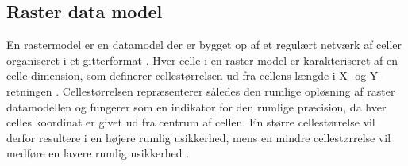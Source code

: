 \subsection{Raster data model} \label{Afsnit: Raster data model}
En rastermodel er en datamodel der er bygget op af et regulært netværk af celler organiseret i et gitterformat \citep{bolstad_gis_2022, esri_raster}. Hver celle i en raster model er karakteriseret af en celle dimension, som definerer cellestørrelsen ud fra cellens længde i X- og Y-retningen \citep{bolstad_gis_2022, silbernagel_raster_2018}. Cellestørrelsen repræsenterer således den rumlige opløsning af raster datamodellen og fungerer som en indikator for den rumlige præcision, da hver celles koordinat er givet ud fra centrum af cellen. En større cellestørrelse vil derfor resultere i en højere rumlig usikkerhed, mens en mindre cellestørrelse vil medføre en lavere rumlig usikkerhed \citep{bolstad_gis_2022}. \\

